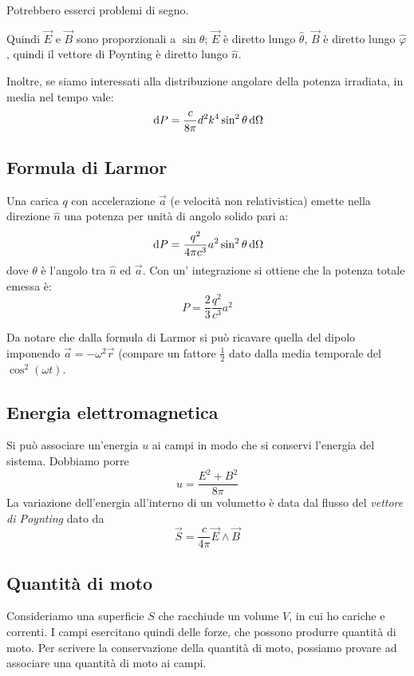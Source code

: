 \documentclass[a4paper,10pt,oneside]{math_article}
\renewcommand{\phi}{\varphi }
\begin{document}
			Potrebbero esserci problemi di segno.

			Quindi $\vec E$ e $\vec B$ sono proporzionali a $\sin \theta$; $\vec E$ è diretto lungo $\hat \theta$, $\vec B$ è diretto lungo $\hat \phi$, quindi il vettore di Poynting è diretto lungo $\hat n$.
			
			Inoltre, se siamo interessati alla distribuzione angolare della potenza irradiata, in media nel tempo vale:
			\[
			 \, \textrm{d} P = \frac c{8\pi} d^2k^4\sin^2\theta  \, \textrm{d}\Omega
			\]
		\subsection{Formula di Larmor} 
			Una carica $q$ con accelerazione $\vec a$ (e velocità non relativistica) emette nella direzione $\hat n$ una potenza per unità di angolo solido pari a:
			\[
				\, \textrm{d} P=\frac{q^2}{4\pi c^3}a^2\sin^2 \theta \, \textrm{d} \Omega
			\]
			dove $\theta$ è l'angolo tra $\hat n$ ed $\vec a$. Con un' integrazione si ottiene che la potenza totale emessa è:
			\[
				P=\frac{2}{3}\frac{q^2}{c^3} a^2
			\]
			
			Da notare che dalla formula di Larmor si può ricavare quella del dipolo imponendo $\vec a = - \omega^2 \vec r$ (compare un fattore $\frac12$ dato dalla media temporale del $\cos^2(\omega t)$.
		\subsection{Energia elettromagnetica}
			Si può associare un'energia $u$ ai campi in modo che si conservi l'energia del sistema. Dobbiamo porre
			\begin{equation}
				u = \frac {E^2+B^2}{8\pi}
			\end{equation}
			La variazione dell'energia all'interno di un volumetto è data dal flusso del \emph{vettore di Poynting} dato da 
			\begin{equation}
				\vec S=\frac{c}{4\pi} \vec E \wedge \vec B
			\end{equation}


			
		\subsection{Quantità di moto}
			Consideriamo una superficie $S$ che racchiude un volume $V$, in cui ho cariche e correnti. I campi esercitano quindi delle forze, che possono produrre quantità di moto. Per scrivere la conservazione della quantità di moto, possiamo provare ad associare una quantità di moto ai campi.
			
\end{document}

